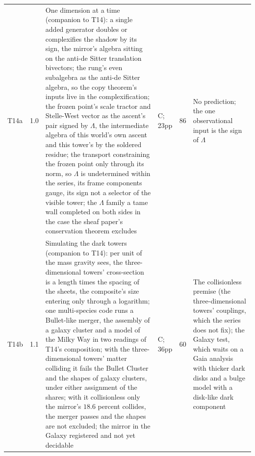 \documentclass[11pt]{article}
\theoremstyle{definition}
\begin{document}
\begin{longtable}{p{} p{} p{} p{} p{} p{}}
T14a & 1.0 & One dimension at a time (companion to T14): a single added generator doubles or complexifies the shadow by its sign, the mirror's algebra sitting on the anti-de Sitter translation bivectors; the rung's even subalgebra as the anti-de Sitter algebra, so the copy theorem's inputs live in the complexification; the frozen point's scale tractor and Stelle-West vector as the ascent's pair signed by $\Lambda$, the intermediate algebra of this world's own ascent and this tower's by the soldered residue; the transport constraining the frozen point only through its norm, so $\Lambda$ is undetermined within the series, its frame components gauge, its sign not a selector of the visible tower; the $\Lambda$ family a tame wall completed on both sides in the case the sheaf paper's conservation theorem excludes \cite{ButlerT14a} & C; 23pp & 86 & No prediction; the one observational input is the sign of $\Lambda$ \\
T14b & 1.1 & Simulating the dark towers (companion to T14): per unit of the mass gravity sees, the three-dimensional towers' cross-section is a length times the spacing of the sheets, the composite's size entering only through a logarithm; one multi-species code runs a Bullet-like merger, the assembly of a galaxy cluster and a model of the Milky Way in two readings of T14's composition; with the three-dimensional towers' matter colliding it fails the Bullet Cluster and the shapes of galaxy clusters, under either assignment of the shares; with it collisionless only the mirror's $18.6$ percent collides, the merger passes and the shapes are not excluded; the mirror in the Galaxy registered and not yet decidable \cite{ButlerT14b} & C; 36pp & 60 & The collisionless premise (the three-dimensional towers' couplings, which the series does not fix); the Galaxy test, which waits on a Gaia analysis with thicker dark disks and a bulge model with a disk-like dark component \\

\end{longtable}
\end{document}
